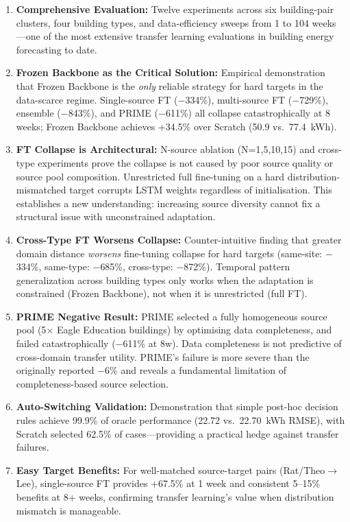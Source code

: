 \documentclass[12pt,a4paper]{report}
\begin{document}
\begin{enumerate}
    \item \textbf{Comprehensive Evaluation:} Twelve experiments across six building-pair clusters, four building types, and data-efficiency sweeps from 1 to 104 weeks---one of the most extensive transfer learning evaluations in building energy forecasting to date.
    
    \item \textbf{Frozen Backbone as the Critical Solution:} Empirical demonstration that Frozen Backbone is the \textit{only} reliable strategy for hard targets in the data-scarce regime. Single-source FT ($-$334\%), multi-source FT ($-$729\%), ensemble ($-$843\%), and PRIME ($-$611\%) all collapse catastrophically at 8 weeks; Frozen Backbone achieves +34.5\% over Scratch (50.9 vs.\ 77.4~kWh).
    
    \item \textbf{FT Collapse is Architectural:} N-source ablation (N=1,5,10,15) and cross-type experiments prove the collapse is not caused by poor source quality or source pool composition. Unrestricted full fine-tuning on a hard distribution-mismatched target corrupts LSTM weights regardless of initialisation. This establishes a new understanding: increasing source diversity cannot fix a structural issue with unconstrained adaptation.
    
    \item \textbf{Cross-Type FT Worsens Collapse:} Counter-intuitive finding that greater domain distance \textit{worsens} fine-tuning collapse for hard targets (same-site: $-$334\%, same-type: $-$685\%, cross-type: $-$872\%). Temporal pattern generalization across building types only works when the adaptation is constrained (Frozen Backbone), not when it is unrestricted (full FT).
    
    \item \textbf{PRIME Negative Result:} PRIME selected a fully homogeneous source pool (5$\times$ Eagle Education buildings) by optimising data completeness, and failed catastrophically ($-$611\% at 8w). Data completeness is not predictive of cross-domain transfer utility. PRIME's failure is more severe than the originally reported $-$6\% and reveals a fundamental limitation of completeness-based source selection.
    
    \item \textbf{Auto-Switching Validation:} Demonstration that simple post-hoc decision rules achieve 99.9\% of oracle performance (22.72 vs.\ 22.70~kWh RMSE), with Scratch selected 62.5\% of cases---providing a practical hedge against transfer failures.
    
    \item \textbf{Easy Target Benefits:} For well-matched source-target pairs (Rat/Theo$\to$Lee), single-source FT provides +67.5\% at 1 week and consistent 5--15\% benefits at 8+ weeks, confirming transfer learning's value when distribution mismatch is manageable.
\end{enumerate}
\end{document}
